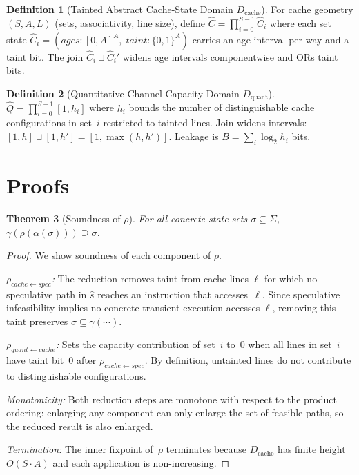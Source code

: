 \documentclass{article}
\newtheorem{theorem}{Theorem}[section]
\theoremstyle{definition}
\newtheorem{definition}[theorem]{Definition}
\theoremstyle{remark}
\newcommand{\Dcache}{D_{\text{cache}}}
\newcommand{\Dquant}{D_{\text{quant}}}
\begin{document}
\begin{definition}[Tainted Abstract Cache-State Domain $\Dcache$]
For cache geometry $(S, A, L)$ (sets, associativity, line size), define
$\hat{C} = \prod_{i=0}^{S-1} \hat{C}_i$ where each set state
$\hat{C}_i = (\mathit{ages}: [0,A]^{A},\; \mathit{taint}: \{0,1\}^{A})$
carries an age interval per way and a taint bit.
The join $\hat{C}_i \sqcup \hat{C}_i'$ widens age intervals componentwise and
ORs taint bits.
\end{definition}

\begin{definition}[Quantitative Channel-Capacity Domain $\Dquant$]
$\hat{Q} = \prod_{i=0}^{S-1} [1, h_i]$ where $h_i$ bounds the number of
distinguishable cache configurations in set~$i$ restricted to tainted lines.
Join widens intervals: $[1,h] \sqcup [1,h'] = [1, \max(h, h')]$.
Leakage is $B = \sum_{i} \log_2 h_i$ bits.
\end{definition}

\section{Proofs}
\label{app:proofs}

\begin{theorem}[Soundness of $\rho$]
\label{thm:rho-sound-app}
For all concrete state sets $\sigma \subseteq \Sigma$,
$\gamma(\rho(\alpha(\sigma))) \supseteq \sigma$.
\end{theorem}

\begin{proof}
We show soundness of each component of $\rho$.

\emph{$\rho_{\mathit{cache} \leftarrow \mathit{spec}}$:}
The reduction removes taint from cache lines $\ell$ for which no speculative path
in $\hat{s}$ reaches an instruction that accesses~$\ell$.  Since speculative
infeasibility implies no concrete transient execution accesses $\ell$, removing
this taint preserves $\sigma \subseteq \gamma(\cdots)$.

\emph{$\rho_{\mathit{quant} \leftarrow \mathit{cache}}$:}
Sets the capacity contribution of set~$i$ to~0 when all lines in set~$i$ have
taint bit~0 after $\rho_{\mathit{cache} \leftarrow \mathit{spec}}$.  By
definition, untainted lines do not contribute to distinguishable configurations.

\emph{Monotonicity:} Both reduction steps are monotone with respect to the
product ordering: enlarging any component can only enlarge the set of feasible
paths, so the reduced result is also enlarged.

\emph{Termination:} The inner fixpoint of~$\rho$ terminates because $\Dcache$
has finite height $O(S \cdot A)$ and each application is non-increasing.
\end{proof}
\end{document}
